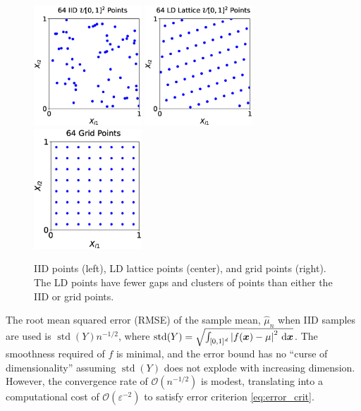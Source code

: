 \documentclass[11pt]{NSFamsart}
\DeclareMathOperator{\std}{std}
\newcommand{\cube}{[0,1]^d}
\newcommand{\bx}{{\boldsymbol{x}}}
\def\dif{\textup{d}}
\def\abs#1{\ensuremath{\left \lvert #1 \right \rvert}}
\newcommand{\Order}{\mathcal{O}}
\newcommand{\hmu}{\hat{\mu}}
\begin{document}
\begin{figure}[H]
	\centering
	\includegraphics[height = 4.5cm]{ProgramsImages/iid_scatter.eps} \quad
	\includegraphics[height = 4.5cm]{ProgramsImages/lattice_scatter.eps} \quad
	\includegraphics[height = 4.5cm]{ProgramsImages/grid_scatter.eps}
	\caption{IID points (left), LD lattice points (center), and grid points (right).  The LD points have fewer gaps and clusters of points than either the IID or grid points. \label{fig:iid_vs_ld}}
\end{figure}

The root mean squared error (RMSE) of the sample mean, $\hmu_n$ when IID samples are used is
$\std(Y)n^{-1/2}$, where $\std(Y) = \sqrt{\int_{\cube} \abs{f(\bx) - \mu}^2 \, \dif \bx}$.  The smoothness required of $f$ is minimal, and the error bound has no ``curse of dimensionality'' assuming $\std(Y)$ does not explode with increasing dimension.  However, the convergence rate of $\Order(n^{-1/2})$ is modest, translating into a computational cost of $\Order(\varepsilon^{-2})$ to satisfy error criterion \eqref{eq:error_crit}.
\end{document}
